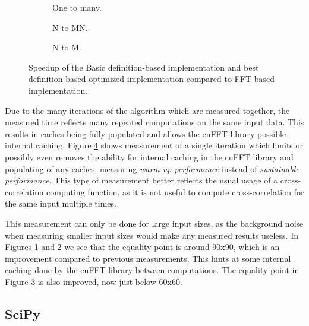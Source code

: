 \begin{figure}[ht]
	\centering	

	\begin{subfigure}{0.4\textwidth}
		\centering
		\def\svgwidth{\textwidth}
		
		\caption{One to many.}
		\label{fig:fft_startup_one_to_many}
	\end{subfigure}
	\begin{subfigure}{0.4\textwidth}
		\centering
		\def\svgwidth{\textwidth}
		
		\caption{N to MN.}
		\label{fig:fft_startup_n_to_mn}
	\end{subfigure}
	\begin{subfigure}{0.4\textwidth}
		\centering
		\def\svgwidth{\textwidth}
		
		\caption{N to M.}
		\label{fig:fft_startup_n_to_m}
	\end{subfigure}
	\caption{Speedup of the Basic definition-based implementation and best definition-based optimized implementation compared to FFT-based implementation.}
	\label{fig:fft_startup}
\end{figure}

Due to the many iterations of the algorithm which are measured together, the measured time reflects many repeated computations on the same input data. This results in caches being fully populated and allows the cuFFT library possible internal caching. Figure \ref{fig:fft_startup} shows measurement of a single iteration which limits or possibly even removes the ability for internal caching in the cuFFT library and populating of any caches, measuring \textit{warm-up performance} instead of \textit{sustainable performance}. This type of measurement better reflects the usual usage of a cross-correlation computing function, as it is not useful to compute cross-correlation for the same input multiple times.

This measurement can only be done for large input sizes, as the background noise when measuring smaller input sizes would make any measured results useless. In Figures \ref{fig:fft_startup_one_to_many} and \ref{fig:fft_startup_n_to_mn} we see that the equality point is around 90x90, which is an improvement compared to previous measurements. This hints at some internal caching done by the cuFFT library between computations. The equality point in Figure \ref{fig:fft_startup_n_to_m} is also improved, now just below 60x60.

\subsection{SciPy}

